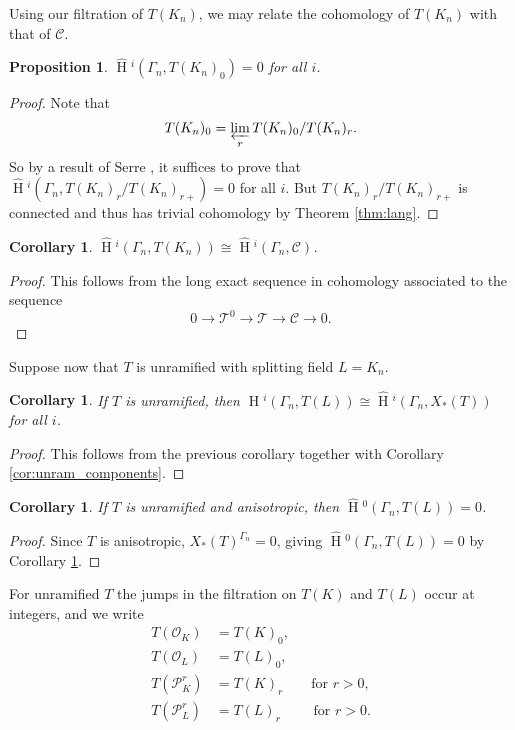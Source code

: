 \documentclass[11pt]{amsart}
\theoremstyle{plain}
\newtheorem{proposition}[theorem]{Proposition}
\newtheorem{corollary}[theorem]{Corollary}
\newcommand{\HT}[1]{\hat{\HH}{}^{#1}}
\theoremstyle{definition}
\DeclareMathOperator{\HH}{H}
\newcommand{\TT}{\mathcal{T}}
\newcommand{\C}{\mathcal{C}}
\newcommand{\OK}{\mathcal{O}_K}
\newcommand{\PK}{\mathcal{P}_K}
\newcommand{\PL}{\mathcal{P}_L}
\newcommand{\OL}{\mathcal{O}_L}
\newcommand{\invlim}[1]{\varprojlim_{#1}}
\begin{document}
Using our filtration of $T(K_n)$, we may relate the cohomology of $T(K_n)$
with that of $\C$.

\begin{proposition}\label{prop:T0_cohom_triv}
$\HT{i}(\Gamma_n, T(K_n)_0) = 0$ for all $i$.
\end{proposition}
\begin{proof}
Note that
$$T(K_n)_0 = \invlim{r} T(K_n)_0 / T(K_n)_r.$$
So by a result of Serre \cite[Lem. 3]{serre:LocalClassFieldThy}, it suffices to prove that
\\ $\HT{i}(\Gamma_n, T(K_n)_r / T(K_n)_{r+}) = 0$ for all $i$.  But $T(K_n)_r / T(K_n)_{r+}$
is connected \cite[Prop. 5.2]{yu:03a} and thus has trivial cohomology by
Theorem \ref{thm:lang}.
\end{proof}

\begin{corollary}
$\HT{i}(\Gamma_n, T(K_n)) \cong \HT{i}(\Gamma_n, \C)$.
\end{corollary}

\begin{proof}
This follows from the long exact sequence in cohomology associated to the sequence
$$0 \rightarrow \TT^0 \rightarrow \TT \rightarrow \C \rightarrow 0.$$
\end{proof}

Suppose now that $T$ is unramified with splitting field $L = K_n$.

\begin{corollary} \label{cor:cohom_tori}
If $T$ is unramified, then $\HT{i}(\Gamma_n, T(L)) \cong \HT{i}(\Gamma_n, X_*(T))$
for all $i$.
\end{corollary}

\begin{proof}
This follows from the previous corollary together with Corollary \ref{cor:unram_components}.
\end{proof}

\begin{corollary}\label{cor:vanishing_H0}
If $T$ is unramified and anisotropic, then $\HT{0}(\Gamma_n, T(L)) = 0$.
\end{corollary}

\begin{proof}
Since $T$ is anisotropic, $X_*(T)^{\Gamma_n} = 0$, giving $\HT{0}(\Gamma_n, T(L)) = 0$ by Corollary
\ref{cor:cohom_tori}.
\end{proof}

For unramified $T$ the jumps in the filtration on $T(K)$ and $T(L)$ occur at integers, and we write
\begin{align*}
T(\OK) &= T(K)_0, \\
T(\OL) &= T(L)_0, \\
T(\PK^r) &= T(K)_r\qquad \mbox{for $r > 0$}, \\
T(\PL^r) &= T(L)_r\qquad\,\,\mbox{for $r > 0$}.
\end{align*}
\end{document}
